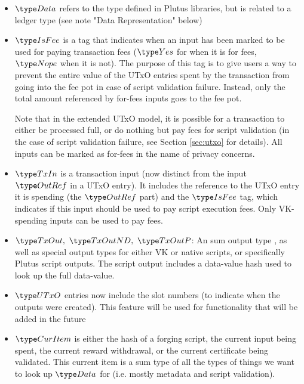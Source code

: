 \begin{itemize}
  \item $\Data$ refers to the type defined in Plutus libraries, but is
  related to a ledger type (see note "Data Representation" below)

  \item $\IsFee$ is a tag that indicates when an input has been marked
  to be used for paying transaction fees ($\Yes$ for when it is for fees,
  $\Nope$ when it is not). The purpose of this tag is to give users a way to prevent
  the entire value of the UTxO entries spent by the transaction
  from going into the fee pot in case of script validation failure.
  Instead, only the total amount referenced by for-fees inputs goes
  to the fee pot.

  Note that in the extended UTxO model, it is possible for a transaction
  to either be processed full, or do nothing but pay fees for script
  validation (in the case of script validation failure, see Section
  \ref{sec:utxo} for details). All inputs can be marked as for-fees in
  the name of privacy concerns.

  \item $\TxIn$ is a transaction input (now distinct from the input $\OutRef$ in
  a UTxO entry). It includes the reference to the UTxO entry it is spending
  (the $\OutRef$ part) and the $\IsFee$ tag, which indicates if this input should
  be used to pay script execution fees. Only VK-spending inputs can be used to
  pay fees.

  \item $\TxOut,~\TxOutND,~\TxOutP$: An sum output type ,
  as well as special output types for either VK or native scripts, or
  specifically Plutus script outputs. The script output
  includes a data-value hash used to look up the full data-value.

  \item $\UTxO$ entries now include the slot numbers (to indicate when the
  outputs were created).
  This feature will be used for functionality that will be added in the future


  \item $\CurItem$ is either the hash of a
  forging script, the current input being
  spent, the current reward
  withdrawal, or the current certificate being validated.
  This current item is a sum type of all the types of things we want to
  look up $\Data$ for (i.e. mostly metadata and script validation).

\end{itemize}


